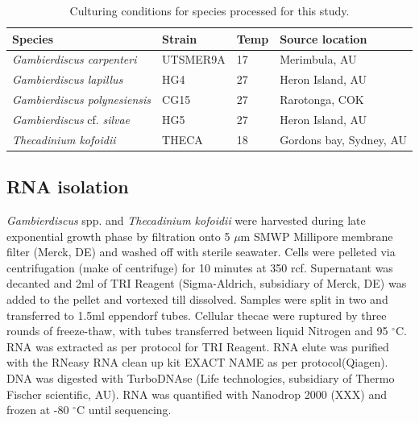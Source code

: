 \documentclass[12pt]{article}
\begin{document}
\begin{table}
\caption{Culturing conditions for species processed for this study.}
\label{tbl:strainTable}
\begin{tabular}{ | p{3cm} | p{2.5cm} | p{1.5cm} | p{5.3cm} |}
\hline
\textbf{Species} & \textbf{Strain}& \textbf{Temp} & \textbf{Source location} \\
\hline
\textit{Gambierdiscus carpenteri}&UTSMER9A&17&Merimbula, AU\\
\hline
\textit{Gambierdiscus lapillus}&HG4&27&Heron Island, AU\\
\hline
\textit{Gambierdiscus polynesiensis}&CG15&27&Rarotonga, COK\\
\hline
\textit{Gambierdiscus} cf. \textit{silvae}&HG5&27&Heron Island, AU\\
\hline
\textit{Thecadinium kofoidii}&THECA&18&Gordons bay, Sydney, AU\\
\hline
\end{tabular}
\end{table}
\FloatBarrier
 \subsection*{RNA isolation}
\emph{Gambierdiscus} spp. and \emph{Thecadinium kofoidii} were harvested during late exponential growth phase by filtration onto 5 $\mu$m SMWP Millipore membrane filter (Merck, DE) and washed off with sterile seawater. 
Cells were pelleted via centrifugation (make of centrifuge) for 10 minutes at 350 rcf. 
Supernatant was decanted and 2ml of TRI Reagent (Sigma-Aldrich, subsidiary of Merck, DE) was added to the pellet and vortexed till dissolved. 
Samples were split in two and transferred to 1.5ml eppendorf tubes. 
Cellular thecae were ruptured by three rounds of freeze-thaw, with tubes transferred between liquid Nitrogen and 95 $^{\circ}$C. 
RNA was extracted as per protocol for TRI Reagent. 
RNA elute was purified with the RNeasy RNA clean up kit EXACT NAME as per protocol(Qiagen). 
DNA was digested with TurboDNAse (Life technologies, subsidiary of Thermo Fischer scientific, AU). 
RNA was quantified with Nanodrop 2000 (XXX) and frozen at -80 $^{\circ}$C until sequencing.
 
\end{document}
